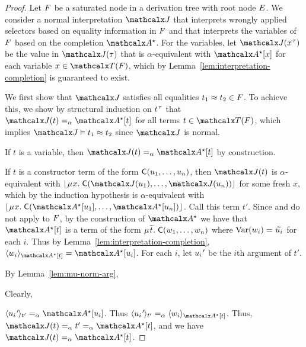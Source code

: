 \begin{proof}
Let $F$ be a saturated node in a derivation tree with root node $E$.
We consider a normal interpretation $\J$
that interprets wrongly applied selectors based on equality information in $F$
and that interprets the variables of $F$ based on the completion $\ValC$.
For the variables, let $\interp{\J}{x\typ{\tau}}$ be the value in $\J(\tau)$ that is $\alpha$-equivalent with $\ValC \ec{x}$ for each variable $x \in \Terms(\Fc)$,
which by Lemma~\ref{lem:interpretation-completion} is guaranteed to exist.

We first show that $\J$ satisfies all equalities $t_1 \approx t_2 \in F$. %
To achieve this, we show
by structural induction on $t\typ\tau$
that $\interp{\J}{t} \aequiv \ValC \ec{t}$ for all terms $t \in \Terms( \Fc )$,
which implies $\J \models t_1 \teq t_2$ since $\J$ is normal.

If $t$ is a variable, then $\interp{\J}{t} \vsim \ValC \ec{ t }$ by construction.

If $t$ is a constructor term of the form $\textsf{C}( u_1, \ldots, u_n )$,
then $\interp{\J}{t}$ is $\alpha$-equivalent with $\nf{\MU x.\; \const{C}( \interp{\J}{u_1}, \ldots, \interp{\J}{u_n} ) }$ for some fresh $x$,
which by the induction hypothesis is $\alpha$-equivalent with $\nf{\MU x.\; \const{C}( \ValC \ec{ u_1 }, \ldots, \ValC \ec{ u_n } )}$.
Call this term $t'$.
Since  and  do not apply to $F$,
by the construction of $\ValC$ we have that $\ValC \ec{t}$ is a term
of the form $\MU {\Varec{t}}.\; \const{C}( w_1,\allowbreak \ldots,\allowbreak w_n )$
where
$\muvar(w_i) = {\Varec{u_i}}$ for each $i$.  Thus by Lemma~\ref{lem:interpretation-completion},
$\expand{\ValC \ec{t}}{w_i} = \ValC \ec{u_i}$.
For each $i$, let $u_\iPrime$ be the $i$\vvthinspace th argument of $t'$.
\begin{rep}By Lemma~\ref{lem:mu-norm-arg},\end{rep}%
\begin{conf}Clearly,\end{conf} %
$\expand{t'}{u_\iPrime} \vsim \ValC \ec{u_i}$.
Thus $\expand{t'}{u_\iPrime} \vsim \expand{\ValC \ec{t}}{ w_i }$. %
Thus, $\interp{\J}{t} \vsim t' \vsim \ValC \ec{t}$, and
we have $\interp{\J}{t} \vsim \ValC \ec{t}$.


\end{proof}
